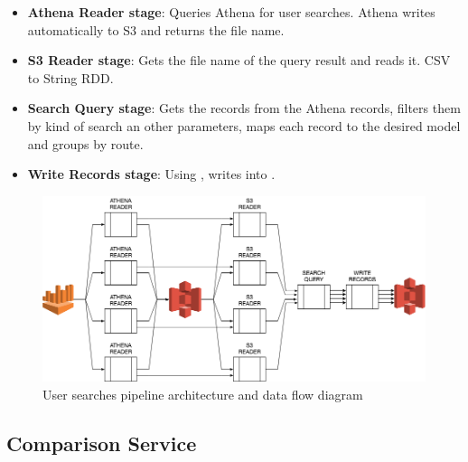 \begin{itemize}
    \item \textbf{Athena Reader stage}: Queries Athena for user searches. Athena writes automatically to S3 and returns the file name.
    \item \textbf{S3 Reader stage}: Gets the file name of the query result and reads it. CSV\cite{csv} to String RDD.
    \item \textbf{Search Query stage}: Gets the records from the Athena records, filters them by kind of search an other parameters, maps each record to the desired model and groups by route.
    \item \textbf{Write Records stage}: Using , writes into .
\end{itemize}

\begin{figure}[H]
\centering
\includegraphics[scale=0.45]{diagrams/user-searches-pipeline-architecture.png}
\caption{User searches pipeline architecture and data flow diagram}
\end{figure}

\subsection{Comparison Service}

